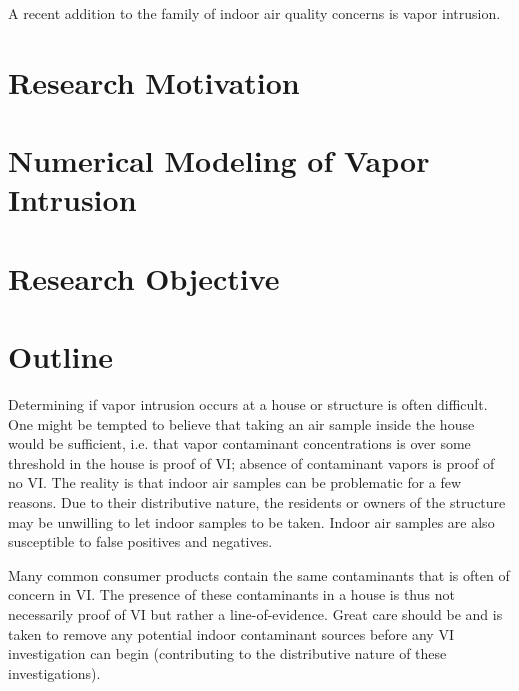 \documentclass[../thesis.tex]{subfiles}
\begin{document}
A recent addition to the family of indoor air quality concerns is vapor intrusion.

\section{Research Motivation}

\section{Numerical Modeling of Vapor Intrusion}

\section{Research Objective}

\section{Outline}



Determining if vapor intrusion occurs at a house or structure is often difficult.
One might be tempted to believe that taking an air sample inside the house would be sufficient, i.e. that vapor contaminant concentrations is over some threshold in the house is proof of VI; absence of contaminant vapors is proof of no VI.
The reality is that indoor air samples can be problematic for a few reasons.
Due to their distributive nature, the residents or owners of the structure may be unwilling to let indoor samples to be taken.
Indoor air samples are also susceptible to false positives and negatives. \par

Many common consumer products contain the same contaminants that is often of concern in VI.
The presence of these contaminants in a house is thus not necessarily proof of VI but rather a line-of-evidence.
Great care should be and is taken to remove any potential indoor contaminant sources before any VI investigation can begin (contributing to the distributive nature of these investigations). \par
\end{document}
